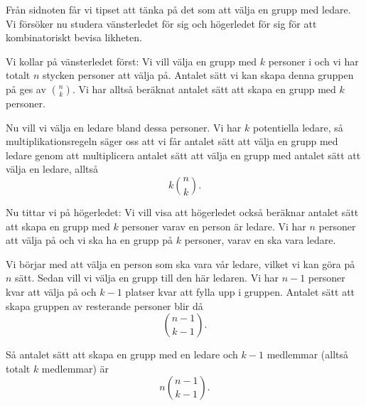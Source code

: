 \documentclass[nobib]{tufte-handout}
\begin{document}
\begin{solution}
	Från sidnoten får vi tipset att tänka på det som att välja en grupp med ledare. Vi försöker nu studera vänsterledet för sig och högerledet för sig för att kombinatoriskt bevisa likheten.

    Vi kollar på vänsterledet först: Vi vill välja en grupp med $k$ personer i och vi har totalt $n$ stycken personer att välja på. Antalet sätt vi kan skapa denna gruppen på ges av $\binom{n}{k}$. Vi har alltså beräknat antalet sätt att skapa en grupp med $k$ personer. 
	
	Nu vill vi välja en ledare bland dessa personer. Vi har $k$ potentiella ledare, så multiplikationsregeln säger oss att vi får antalet sätt att välja en grupp med ledare genom att multiplicera antalet sätt att välja en grupp med antalet sätt att välja en ledare, alltså
	$$k\binom{n}{k}.$$

    Nu tittar vi på högerledet: Vi vill visa att högerledet också beräknar antalet sätt att skapa en grupp med $k$ personer varav en person är ledare. Vi har $n$ personer att välja på och vi ska ha en grupp på $k$ personer, varav en ska vara ledare. 
	
	Vi börjar med att välja en person som ska vara vår ledare, vilket vi kan göra på $n$ sätt. Sedan vill vi välja en grupp till den här ledaren. Vi har $n-1$ personer kvar att välja på och $k-1$ platser kvar att fylla upp i gruppen. Antalet sätt att skapa gruppen av resterande personer blir då
	$$\binom{n-1}{k-1}.$$
	
	Så antalet sätt att skapa en grupp med en ledare och $k-1$ medlemmar (alltså totalt $k$ medlemmar) är
	$$n \binom{n-1}{k-1}.$$


\end{solution}
\end{document}
